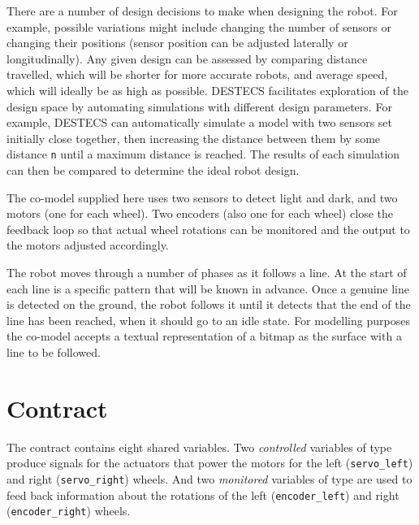 There are a number of design decisions to make when designing the
robot.  For example, possible variations might include changing the
number of sensors or changing their positions (sensor position can be
adjusted laterally or longitudinally). Any given design can be
assessed by comparing distance travelled, which will be shorter for
more accurate robots, and average speed, which will ideally be as high
as possible.  DESTECS facilitates exploration of the design space by
automating simulations with different design parameters. For example,
DESTECS can automatically simulate a model with two sensors set
initially close together, then increasing the distance between them by
some distance \texttt{n} until a maximum distance is reached.  The
results of each simulation can then be compared to determine the ideal
robot design.

The co-model supplied here uses two sensors to detect light and dark,
and two motors (one for each wheel).  Two encoders (also one for each
wheel) close the feedback loop so that actual wheel rotations can be
monitored and the output to the motors adjusted accordingly.

The robot moves through a number of phases as it follows a line.  At
the start of each line is a specific pattern that will be known in
advance.  Once a genuine line is detected on the ground, the robot
follows it until it detects that the end of the line has been reached,
when it should go to an idle state.  For modelling purposes the
co-model accepts a textual representation of a bitmap as the surface with a line to be followed.



%
%
%
%

\section{Contract}
The contract contains eight shared variables.  Two \emph{controlled}
variables of type  produce signals for the actuators that
power the motors for the left (\texttt{servo\_left}) and right
(\texttt{servo\_right}) wheels.  And two \emph{monitored}
variables of type  are used to feed back information about
the rotations of the left (\texttt{encoder\_left}) and right
(\texttt{encoder\_right}) wheels.

